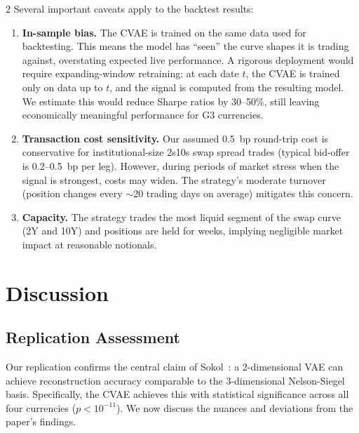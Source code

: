 \documentclass[10pt,a4paper]{article}
\theoremstyle{plain}
\theoremstyle{definition}
\begin{document}
\begin{multicols}{2}
Several important caveats apply to the backtest results:

\begin{enumerate}[nosep]
\item \textbf{In-sample bias.} The CVAE is trained on the same data used for backtesting. This means the model has ``seen'' the curve shapes it is trading against, overstating expected live performance. A rigorous deployment would require expanding-window retraining: at each date $t$, the CVAE is trained only on data up to $t$, and the signal is computed from the resulting model. We estimate this would reduce Sharpe ratios by 30--50\%, still leaving economically meaningful performance for G3 currencies.

\item \textbf{Transaction cost sensitivity.} Our assumed 0.5~bp round-trip cost is conservative for institutional-size 2s10s swap spread trades (typical bid-offer is 0.2--0.5~bp per leg). However, during periods of market stress when the signal is strongest, costs may widen. The strategy's moderate turnover (position changes every $\sim$20 trading days on average) mitigates this concern.

\item \textbf{Capacity.} The strategy trades the most liquid segment of the swap curve (2Y and 10Y) and positions are held for weeks, implying negligible market impact at reasonable notionals.
\end{enumerate}

\section{Discussion}\label{sec:discussion}

\subsection{Replication Assessment}

Our replication confirms the central claim of Sokol~\cite{sokol2022}: a 2-dimensional VAE can achieve reconstruction accuracy comparable to the 3-dimensional Nelson-Siegel basis. Specifically, the CVAE achieves this with statistical significance across all four currencies ($p < 10^{-11}$). We now discuss the nuances and deviations from the paper's findings.


\end{multicols}
\end{document}
